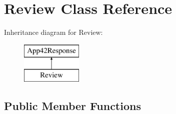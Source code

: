\hypertarget{class_review}{\section{Review Class Reference}
\label{class_review}
}
Inheritance diagram for Review\+:\begin{figure}[H]
\begin{center}
\leavevmode
\includegraphics[height=2.000000cm]{class_review}
\end{center}
\end{figure}
\subsection*{Public Member Functions}
